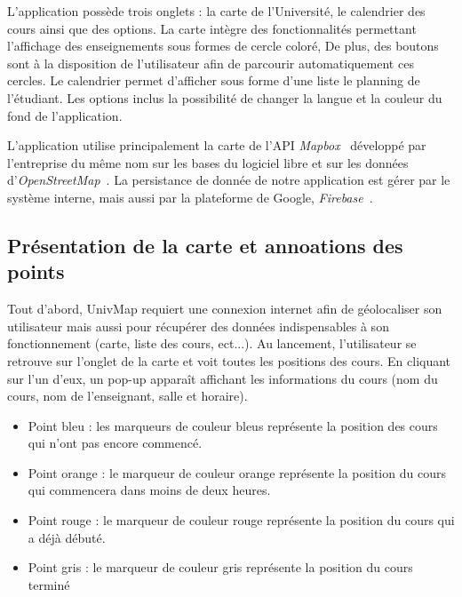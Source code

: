 \documentclass{article}
\begin{document}
L'application possède trois onglets : la carte de l'Université, le calendrier des cours ainsi que des options.
La carte intègre des fonctionnalités permettant l'affichage des enseignements sous formes de cercle coloré, De plus,
des boutons sont à la disposition de l'utilisateur afin de parcourir automatiquement ces cercles.
Le calendrier permet d'afficher sous forme d'une liste le planning de l'étudiant.
Les options inclus la possibilité de changer la langue et la couleur du fond de l'application.

L'application utilise principalement la carte de l'API \textit{Mapbox}~\cite{mapboxDoc} développé par l'entreprise
du même nom sur les bases du logiciel libre et sur les données d'\textit{OpenStreetMap}~\cite{openstreetmapDoc}.
La persistance de donnée de notre application est gérer par le système interne, mais aussi par la plateforme
de Google, \textit{Firebase}~\cite{firebaseDoc}.



\newpage %



\subsection{Présentation de la carte et annoations des points}

Tout d'abord, UnivMap requiert une connexion internet afin de géolocaliser son utilisateur mais aussi
pour récupérer des données indispensables à son fonctionnement (carte, liste des cours, ect...). Au lancement,
l'utilisateur se retrouve sur l'onglet de la carte et voit toutes les positions des cours. En cliquant sur l'un d'eux,
un pop-up apparaît affichant les informations du cours (nom du cours, nom de l'enseignant, salle et horaire).\\

\begin{itemize}
    \item Point bleu : les marqueurs de couleur bleus représente la position des cours qui n'ont pas encore commencé.

    \item Point orange : le marqueur de couleur orange représente la position du cours qui commencera dans
    moins de deux heures.

    \item Point rouge : le marqueur de couleur rouge représente la position du cours qui a déjà débuté.

    \item Point gris : le marqueur de couleur gris représente la position du cours terminé
\end{itemize}
\end{document}
